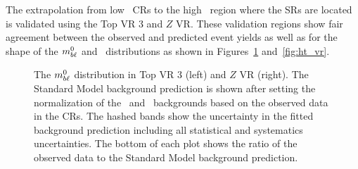 The extrapolation from low \HT\ CRs to the high \HT\ region
where the SRs are located is validated using the Top VR 3
and $Z$ VR. These validation regions show fair
agreement between the observed and predicted event yields as well as
for the shape of the $m_{b\ell}^{0}$ and \HT\ distributions as shown in
Figures~\ref{fig:mbl_vr} and~\ref{fig:ht_vr}.

\begin{figure}
  \centering
  \caption[
    The $\MBL^0$ distribution in Top VR 3 (left) and $Z$ VR (right).
  ]{
    The $\MBL^0$ distribution in Top VR 3 (left) and $Z$ VR (right).
    The Standard Model background prediction is shown after setting the
    normalization of the \TTBAR\ and \ZGAMMAJETS\ backgrounds based on the
    observed data in the CRs. The hashed bands show the uncertainty in the
    fitted background prediction including all statistical and systematics
    uncertainties.
    The bottom of each plot shows the ratio of the observed data to the
    Standard Model background prediction.
  }
  \label{fig:mbl_vr}
\end{figure}

